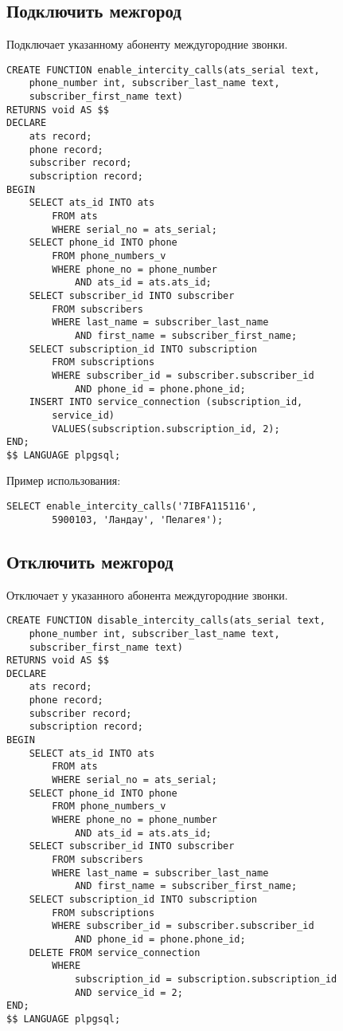\documentclass{report}
\begin{document}
\subsection*{Подключить межгород}

Подключает указанному абоненту междугородние звонки.

\begin{lstlisting}
CREATE FUNCTION enable_intercity_calls(ats_serial text, 
    phone_number int, subscriber_last_name text, 
    subscriber_first_name text) 
RETURNS void AS $$
DECLARE
    ats record;
    phone record;
    subscriber record;
    subscription record;
BEGIN
    SELECT ats_id INTO ats 
        FROM ats 
        WHERE serial_no = ats_serial;
    SELECT phone_id INTO phone
        FROM phone_numbers_v
        WHERE phone_no = phone_number
            AND ats_id = ats.ats_id;
    SELECT subscriber_id INTO subscriber
        FROM subscribers
        WHERE last_name = subscriber_last_name
            AND first_name = subscriber_first_name;
    SELECT subscription_id INTO subscription
        FROM subscriptions
        WHERE subscriber_id = subscriber.subscriber_id
            AND phone_id = phone.phone_id;
    INSERT INTO service_connection (subscription_id, 
        service_id)
        VALUES(subscription.subscription_id, 2);
END;
$$ LANGUAGE plpgsql;
\end{lstlisting}

Пример использования:
\begin{lstlisting}
SELECT enable_intercity_calls('7IBFA115116',
        5900103, 'Ландау', 'Пелагея');
\end{lstlisting}

\subsection*{Отключить межгород}

Отключает у указанного абонента междугородние звонки.

\begin{lstlisting}
CREATE FUNCTION disable_intercity_calls(ats_serial text, 
    phone_number int, subscriber_last_name text, 
    subscriber_first_name text) 
RETURNS void AS $$
DECLARE
    ats record;
    phone record;
    subscriber record;
    subscription record;
BEGIN
    SELECT ats_id INTO ats 
        FROM ats 
        WHERE serial_no = ats_serial;
    SELECT phone_id INTO phone
        FROM phone_numbers_v 
        WHERE phone_no = phone_number
            AND ats_id = ats.ats_id;
    SELECT subscriber_id INTO subscriber
        FROM subscribers
        WHERE last_name = subscriber_last_name
            AND first_name = subscriber_first_name;
    SELECT subscription_id INTO subscription
        FROM subscriptions
        WHERE subscriber_id = subscriber.subscriber_id
            AND phone_id = phone.phone_id;
    DELETE FROM service_connection
        WHERE 
            subscription_id = subscription.subscription_id
            AND service_id = 2;
END;
$$ LANGUAGE plpgsql;
\end{lstlisting}
\end{document}
